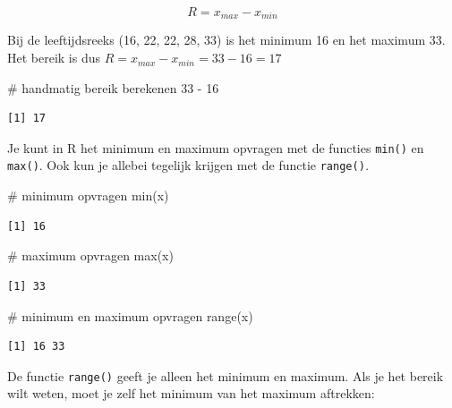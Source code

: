 \documentclass[
  letterpaper,
  DIV=11,
  numbers=noendperiod]{scrreprt}
\newenvironment{Shaded}{\begin{snugshade}}{\end{snugshade}}
\newcommand{\CommentTok}[1]{\textcolor[rgb]{0.37,0.37,0.37}{#1}}
\newcommand{\DecValTok}[1]{\textcolor[rgb]{0.68,0.00,0.00}{#1}}
\newcommand{\FunctionTok}[1]{\textcolor[rgb]{0.28,0.35,0.67}{#1}}
\newcommand{\NormalTok}[1]{\textcolor[rgb]{0.00,0.23,0.31}{#1}}
\newcommand{\SpecialCharTok}[1]{\textcolor[rgb]{0.37,0.37,0.37}{#1}}
\begin{document}
\[R=x_{max}-x_{min}\]

Bij de leeftijdsreeks (16, 22, 22, 28, 33) is het minimum 16 en het
maximum 33. Het bereik is dus \(R=x_{max}-x_{min}=33-16=17\)

\begin{Shaded}
\begin{Highlighting}[]
\CommentTok{\# handmatig bereik berekenen}
\DecValTok{33} \SpecialCharTok{{-}} \DecValTok{16}
\end{Highlighting}
\end{Shaded}

\begin{verbatim}
[1] 17
\end{verbatim}

Je kunt in R het minimum en maximum opvragen met de functies
\texttt{min()} en \texttt{max()}. Ook kun je allebei tegelijk krijgen
met de functie \texttt{range()}\emph{.}

\begin{Shaded}
\begin{Highlighting}[]
\CommentTok{\# minimum opvragen}
\FunctionTok{min}\NormalTok{(x)}
\end{Highlighting}
\end{Shaded}

\begin{verbatim}
[1] 16
\end{verbatim}

\begin{Shaded}
\begin{Highlighting}[]
\CommentTok{\# maximum opvragen}
\FunctionTok{max}\NormalTok{(x)}
\end{Highlighting}
\end{Shaded}

\begin{verbatim}
[1] 33
\end{verbatim}

\begin{Shaded}
\begin{Highlighting}[]
\CommentTok{\# minimum en maximum opvragen}
\FunctionTok{range}\NormalTok{(x)}
\end{Highlighting}
\end{Shaded}

\begin{verbatim}
[1] 16 33
\end{verbatim}

De functie \texttt{range()} geeft je alleen het minimum en maximum. Als
je het bereik wilt weten, moet je zelf het minimum van het maximum
aftrekken:
\end{document}
